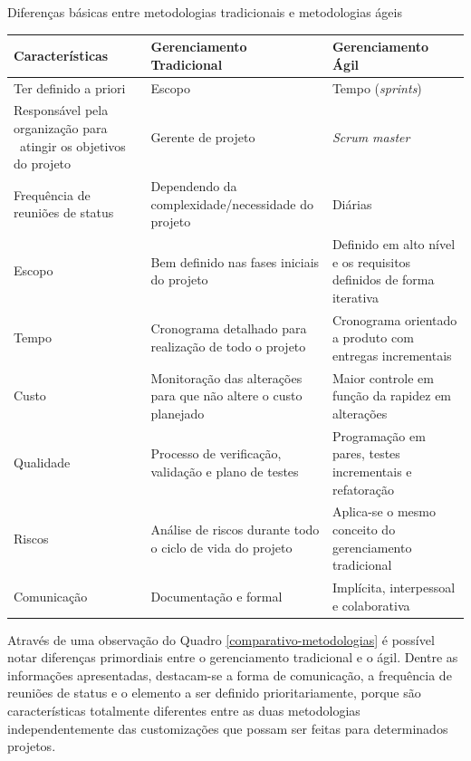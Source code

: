 \begin{quadro}[h]
\centering
{}
\caption{Diferenças básicas entre metodologias tradicionais e metodologias ágeis}
\vspace{0.5cm}

\setlength{\extrarowheight}{0.25cm}
\begin{tabular}{|L|L|L|}
\hline
\textbf{Características} & \textbf{Gerenciamento Tradicional} & \textbf{Gerenciamento Ágil} \\ %
\hline
Ter definido a priori & Escopo & Tempo (\textit{sprints})\\
\hline
Responsável pela organização para \ atingir os objetivos do projeto & Gerente de projeto & \textit{Scrum master}\\
\hline
Frequência de reuniões de status & Dependendo da complexidade/necessidade do projeto & Diárias\\
\hline
Escopo & Bem definido nas fases iniciais do projeto & Definido em alto nível e os requisitos definidos de forma iterativa\\
\hline
Tempo & Cronograma detalhado para realização de todo o projeto & Cronograma orientado a produto com entregas incrementais\\
\hline
Custo & Monitoração das alterações para que não altere o custo planejado & Maior controle em função da rapidez em alterações\\
\hline
Qualidade & Processo de verificação, validação e plano de testes & Programação em pares, testes incrementais e refatoração\\
\hline
Riscos & Análise de riscos durante todo o ciclo de vida do projeto & Aplica-se o mesmo conceito do gerenciamento tradicional\\
\hline
Comunicação & Documentação e formal & Implícita, interpessoal e colaborativa\\

\hline
\end{tabular}
\label{comparativo-metodologias}
\end{quadro}


Através de uma observação do Quadro \ref{comparativo-metodologias} é possível notar diferenças primordiais entre o gerenciamento tradicional e o ágil. Dentre as informações apresentadas, destacam-se a forma de comunicação, a frequência de reuniões de status e o elemento a ser definido prioritariamente, porque são características totalmente diferentes entre as duas metodologias independentemente das customizações que possam ser feitas para determinados projetos. 

